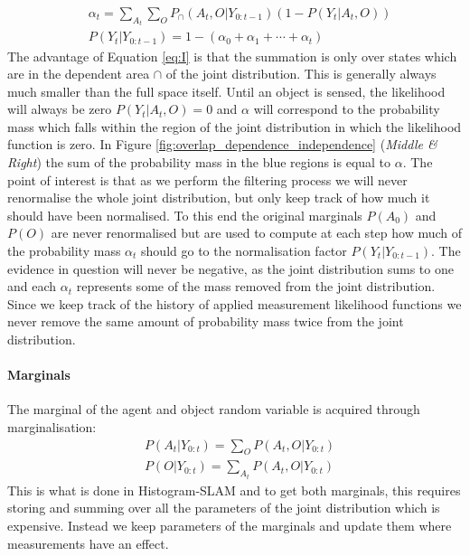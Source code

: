 \begin{align}\label{eq:I}
 &\alpha_t 	  = \sum\limits_{A_t}\sum\limits_{O} P_{\cap}(A_t,O|Y_{0:t-1}) (1 - P(Y_t|A_t,O)) \\
 &P(Y_t|Y_{0:t-1}) = 1 - (\alpha_{0} + \alpha_{1} + \cdots + \alpha_{t})
\end{align}
The advantage of Equation \ref{eq:I} is that the summation is only over states which are in the dependent area $\cap$ of the joint 
distribution. This is generally always much smaller than the full space itself.
Until an object is sensed, the likelihood will always be zero $P(Y_t|A_t,O) = 0$ and $\alpha$ will correspond to the probability 
mass which falls within the region of the joint distribution in which the likelihood function is zero. In Figure 
\ref{fig:overlap_dependence_independence} (\textit{Middle \& Right}) the sum of the probability mass in the blue 
regions is equal to $\alpha$.
The point of interest is that as we perform the filtering process we will never renormalise the whole joint distribution, but only keep 
track of how much it should have been normalised. To this end the original marginals $P(A_0)$ and $P(O)$  are never renormalised but are used 
to compute at each step how much of the probability mass $\alpha_t$ should go to the normalisation factor $P(Y_t|Y_{0:t-1})$. 
The evidence in question will never be negative, as the joint distribution sums to one and each $\alpha_t$ represents some of the mass removed from the joint distribution. Since we 
keep track of the history of applied  measurement likelihood functions we never remove the same amount of probability mass twice
from the joint distribution.

\paragraph{Marginals}

The marginal of the agent and object random variable is acquired through marginalisation:
\begin{align}
  &P(A_t|Y_{0:t}) = \sum\limits_{O}   P(A_t,O|Y_{0:t})\nonumber \\
  &P(O|Y_{0:t})   = \sum\limits_{A_t} P(A_t,O|Y_{0:t})\nonumber
\end{align}
This is what is done in Histogram-SLAM and to get both marginals, this requires storing and summing over all the parameters 
of the joint distribution which is expensive. Instead we keep parameters of the marginals and update them where measurements
have an effect.

